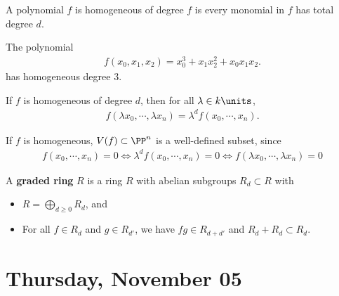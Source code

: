 \begin{definition}

A polynomial \(f\) is homogeneous of degree \(f\) is every monomial in
\(f\) has total degree \(d\).

\end{definition}

\begin{example}[?]

The polynomial
\begin{align*}  
f(x_0, x_1, x_2) = x_0^3 + x_1 x_2^2 + x_0 x_1 x_2
.\end{align*} has homogeneous degree 3.

\end{example}

\begin{remark}

If \(f\) is homogeneous of degree \(d\), then for all
\(\lambda \in k\units\),
\begin{align*}  
f(\lambda x_0, \cdots, \lambda x_n) = \lambda^d f(x_0, \cdots, x_n)
.\end{align*}

If \(f\) is homogeneous, \(V(f) \subset \PP^n\) is a well-defined
subset, since
\begin{align*}
f(x_0, \cdots, x_n) = 0 \iff \lambda^d f(x_0, \cdots, x_n) = 0 \iff f(\lambda x_0, \cdots, \lambda x_n) = 0
\end{align*}

\end{remark}

\begin{definition}

A \textbf{graded ring} \(R\) is a ring \(R\) with abelian subgroups
\(R_d \subset R\) with

\begin{itemize}
\tightlist
\item
  \(R = \bigoplus_{d\geq 0} R_d\), and
\item
  For all \(f\in R_d\) and \(g\in R_{d'}\), we have \(fg \in R_{d+d'}\)
  and \(R_d + R_{d} \subset R_d\).
\end{itemize}

\end{definition}

\hypertarget{thursday-november-05}{%
\section{Thursday, November 05}\label{thursday-november-05}}

